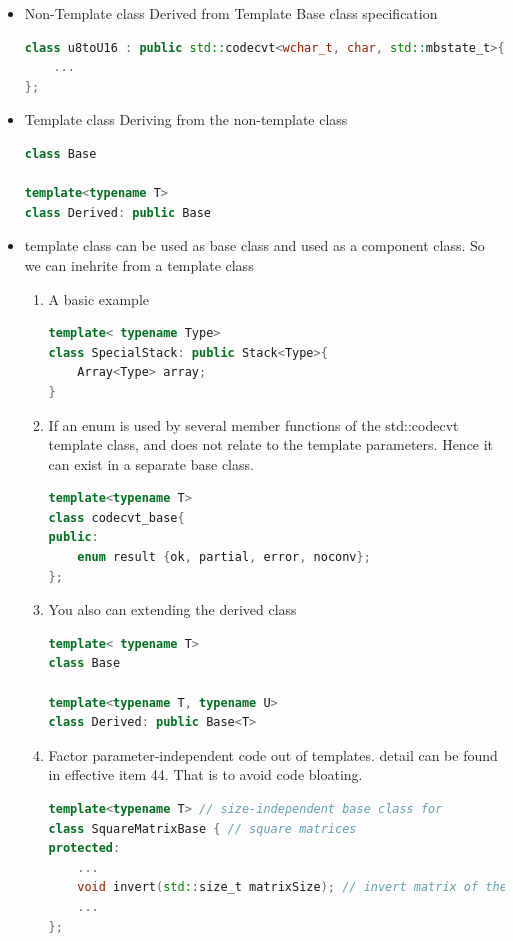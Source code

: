 \documentclass[a4paper,11pt,twoside]{book}
\begin{document}
\begin{itemize}
	
	\item Non-Template class Derived from Template Base class specification

\begin{lstlisting}[frame=single, language=c++]
class u8toU16 : public std::codecvt<wchar_t, char, std::mbstate_t>{
	...
};
\end{lstlisting}

	\item Template class Deriving from the non-template class
\begin{lstlisting}[frame=single, language=c++]
class Base
	
template<typename T>
class Derived: public Base
\end{lstlisting}	
	
	\item template class can be used as base class and used as a component class. So we can inehrite from a template class
\begin{enumerate}
	\item A basic example
\begin{lstlisting}[frame=single, language=c++]
template< typename Type>
class SpecialStack: public Stack<Type>{
	Array<Type> array;
}
\end{lstlisting}	
	
	\item If an enum is used by several member functions of the std::codecvt template class, and does not relate to the template parameters. Hence it can exist in a separate base class.
	
\begin{lstlisting}[frame=single, language=c++]
template<typename T>
class codecvt_base{
public:
	enum result {ok, partial, error, noconv};
};
\end{lstlisting}
	
	\item You also can extending the derived class
\begin{lstlisting}[frame=single, language=c++]
template< typename T>
class Base
	
template<typename T, typename U>
class Derived: public Base<T>
\end{lstlisting}
	
	
	\item Factor parameter-independent code out of templates. detail can be found in effective item 44. That is to avoid code bloating.
\begin{lstlisting}[frame=single, language=c++]
template<typename T> // size-independent base class for
class SquareMatrixBase { // square matrices
protected:
	...
	void invert(std::size_t matrixSize); // invert matrix of the given size
	...
};
	

\end{lstlisting}
\end{enumerate}
\end{itemize}
\end{document}

